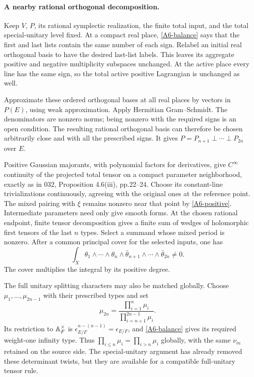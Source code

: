 \documentclass[11pt]{article}
\theoremstyle{definition}\newtheorem{definition}[theorem]{Definition}\newtheorem{remark}[theorem]{Remark}
\begin{document}
\paragraph{A nearby rational orthogonal decomposition.}
Keep $V$, $P$, its rational symplectic realization, the finite total
input, and the total special-unitary level fixed. At a compact real
place, \eqref{A6-balance} says that the first and last lists contain
the same number of each sign. Relabel an initial real orthogonal
basis to have the desired last-list labels. This leaves its aggregate
positive and negative multiplicity subspaces unchanged. At the
active place every line has the same sign, so the total active
positive Lagrangian is unchanged as well.

Approximate these ordered orthogonal bases at all real places by
vectors in $P(E)$, using weak approximation. Apply Hermitian
Gram--Schmidt. The denominators are nonzero norms; being nonzero
with the required signs is an open condition. The resulting
rational orthogonal basis can therefore be chosen arbitrarily close
and with all the prescribed signs. It gives
$P=P_{n+1}\perp\cdots\perp P_{2n}$ over $E$.

Positive Gaussian majorants, with polynomial factors for derivatives,
give $C^\infty$ continuity of the projected total tensor on a compact
parameter neighborhood, exactly as in 032, Proposition 4.6(iii),
pp.22--24. Choose its constant-line trivializations continuously,
agreeing with the original ones at the reference point. The mixed
pairing with $\xi$ remains nonzero near that point by
\eqref{A6-positive}. Intermediate parameters need only give smooth
forms. At the chosen rational endpoint, finite tensor decomposition
gives a finite sum of wedges of holomorphic first tensors of the last
$n$ types. Select a summand whose mixed period is nonzero. After
a common principal cover for the selected inputs, one has
\begin{equation}\label{A6-period}
 \int_X\theta_1\wedge\cdots\wedge\theta_n
       \wedge\bar\theta_{n+1}\wedge\cdots\wedge\bar\theta_{2n}
        \ne0.
\end{equation}
The cover multiplies the integral by its positive degree.

The full unitary splitting characters may also be matched globally.
Choose $\mu_1,\ldots,\mu_{2n-1}$ with their prescribed types and set
\[
 \mu_{2n}=\frac{\prod_{i=1}^n\mu_i}
                    {\prod_{i=n+1}^{2n-1}\mu_i}.
\]
Its restriction to $\mathbb A_F^\times$ is
$\epsilon_{E/F}^{n-(n-1)}=\epsilon_{E/F}$, and
\eqref{A6-balance} gives its required weight-one infinity type.
Thus $\prod_{i\leq n}\mu_i=\prod_{i>n}\mu_i$ globally, with the
same $\nu_m$ retained on the source side. The special-unitary
argument has already removed these determinant twists, but they
are available for a compatible full-unitary tensor rule.
\end{document}
